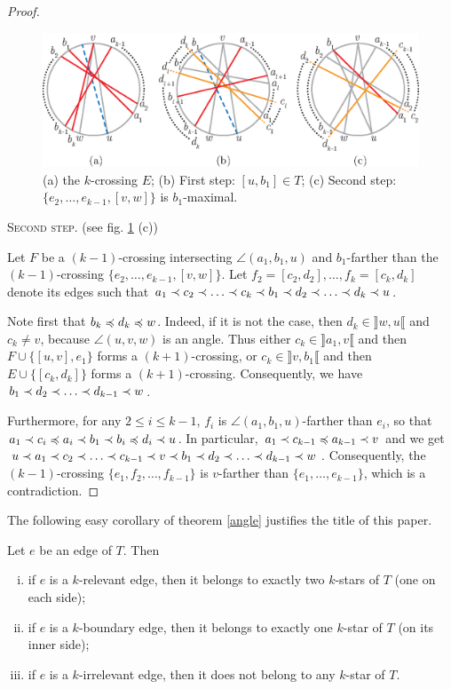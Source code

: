 \documentclass[12pt]{amsart}
\begin{document}
\begin{proof}
\begin{figure}
\centerline{\includegraphics[scale=1]{twosteps.eps}}
\caption{\small{(a) the $k$-crossing $E$; (b) First step: $[u,b_1]\in T$; (c) Second step: $\{e_2,\ldots,e_{k-1},[v,w]\}$ is $b_1$-maximal.}}\label{twosteps}
\end{figure}

\medskip
\noindent\textsc{Second step.} (see fig. \ref{twosteps} (c))

Let $F$ be a $(k-1)$-crossing intersecting $\angle(a_1,b_1,u)$ and $b_1$-farther than the $(k-1)$-crossing $\{e_2,\ldots,e_{k-1},[v,w]\}$. Let $f_2=[c_2,d_2],\ldots,f_k=[c_k,d_k]$ denote its edges such that $a_1\prec c_2\prec \ldots\prec c_k\prec b_1\prec d_2\prec \ldots\prec d_k\prec u$. 

Note first that $b_k\preccurlyeq d_k\preccurlyeq w$. Indeed, if it is not the case, then $d_k\in\rrbracket w,u\llbracket$ and $c_k\ne v$, because $\angle(u,v,w)$ is an angle. Thus either $c_k\in\rrbracket a_1,v\llbracket$ and  then $F\cup\{[u,v],e_1\}$ forms a $(k+1)$-crossing, or $c_k\in\rrbracket v,b_1\llbracket$ and  then $E\cup\{[c_k,d_k]\}$ forms a $(k+1)$-crossing. Consequently, we have $b_1\prec d_2\prec\ldots\prec d_{k-1}\prec w$.

Furthermore, for any $2\le i\le k-1$, $f_i$ is $\angle(a_1,b_1,u)$-farther than $e_i$, so that $a_1\prec c_i\preccurlyeq a_i\prec b_1\prec b_i\preccurlyeq d_i\prec u$. In particular, $a_1\prec c_{k-1}\preccurlyeq a_{k-1}\prec v$ and we get $u\prec a_1\prec c_2\prec\ldots\prec c_{k-1}\prec v\prec b_1\prec d_2\prec \ldots\prec d_{k-1}\prec w$. Consequently, the $(k-1)$-crossing $\{e_1,f_2,\ldots,f_{k-1}\}$ is $v$-farther than $\{e_1,\ldots,e_{k-1}\}$, which is a contradiction.
\end{proof}

The following easy corollary of theorem \ref{angle} justifies the title of this paper.

\begin{corollary}\label{incidences}
Let $e$ be an edge of $T$. Then
\begin{enumerate}[(i)]
\item if $e$ is a $k$-relevant edge, then it belongs to exactly two $k$-stars of $T$ (one on each side);
\item if $e$ is a $k$-boundary edge, then it belongs to exactly one $k$-star of $T$ (on its inner side); \item if $e$ is a $k$-irrelevant edge, then it does not belong to any $k$-star of $T$.
\end{enumerate}
\end{corollary}
\end{document}
